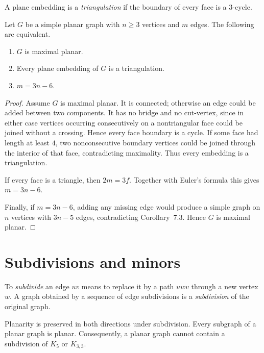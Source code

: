 \begin{notedefinition}
A plane embedding is a \emph{triangulation} if the boundary of every face is
a $3$-cycle.
\end{notedefinition}

\begin{notetheorem}
Let $G$ be a simple planar graph with $n\ge3$ vertices and $m$ edges.  The
following are equivalent.
\begin{enumerate}
  \item $G$ is maximal planar.
  \item Every plane embedding of $G$ is a triangulation.
  \item $m=3n-6$.
\end{enumerate}
\end{notetheorem}
\begin{proof}
Assume $G$ is maximal planar.  It is connected; otherwise an edge could be
added between two components.  It has no bridge and no cut-vertex, since in
either case vertices occurring consecutively on a nontriangular face could be
joined without a crossing.  Hence every face boundary is a cycle.  If some
face had length at least $4$, two nonconsecutive boundary vertices could be
joined through the interior of that face, contradicting maximality.  Thus
every embedding is a triangulation.

If every face is a triangle, then $2m=3f$.  Together with Euler's formula this
gives $m=3n-6$.

Finally, if $m=3n-6$, adding any missing edge would produce a simple graph on
$n$ vertices with $3n-5$ edges, contradicting Corollary~7.3.  Hence $G$ is
maximal planar.
\end{proof}
\section{Subdivisions and minors}

\begin{notedefinition}
To \emph{subdivide} an edge $uv$ means to replace it by a path $uwv$ through
a new vertex $w$.  A graph obtained by a sequence of edge subdivisions is a
\emph{subdivision} of the original graph.
\end{notedefinition}

\begin{noteremark}
Planarity is preserved in both directions under subdivision.  Every subgraph
of a planar graph is planar.  Consequently, a planar graph cannot contain a
subdivision of $K_5$ or $K_{3,3}$.
\end{noteremark}

